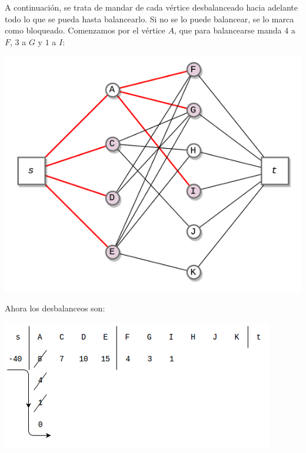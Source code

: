 \documentclass[10pt,a4paper]{article}
\begin{document}
A continuación, se trata de mandar de cada vértice desbalanceado hacia adelante todo lo que se pueda hasta balancearlo. Si no se lo puede balancear, se lo marca como bloqueado. Comenzamos por el vértice $A$, que para balancearse manda $4$ a $F$, $3$ a $G$ y $1$ a $I$:

\begin{center}

    \begin{adjustbox}{max size={\textwidth}{\textheight}}
        \includegraphics{definitions/wave_3.jpg}
        \end{adjustbox}
    
\end{center}

Ahora los desbalanceos son:

\begin{center}

    \begin{adjustbox}{max size={\textwidth}{\textheight}}
        \includegraphics{definitions/wave_b3.jpg}
        \end{adjustbox}
    
\end{center}
\end{document}
